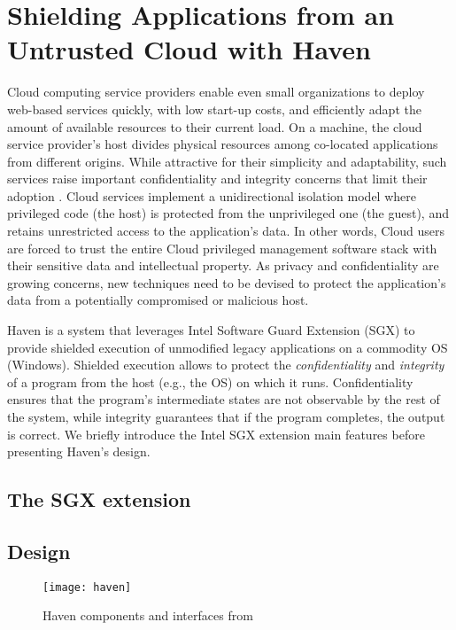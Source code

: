 \section{Shielding Applications from an Untrusted Cloud with Haven}

Cloud computing service providers enable even small organizations to deploy web-based services quickly, with low start-up costs, and efficiently adapt the amount of available resources to their current load.
On a machine, the cloud service provider's host divides physical resources among co-located applications from different origins.
While attractive for their simplicity and adaptability, such services raise important confidentiality and integrity concerns that limit their adoption \cite{mining,NSAYahoo}.
Cloud services implement a unidirectional isolation model where privileged code (the host) is protected from the unprivileged one (the guest), and retains unrestricted access to the application's data.
In other words, Cloud users are forced to trust the entire Cloud privileged management software stack with their sensitive data and intellectual property.
As privacy and confidentiality are growing concerns, new techniques need to be devised to protect the application's data from a potentially compromised or malicious host.

Haven \cite{DBLP:journals/tocs/BaumannPH15} is a system that leverages Intel Software Guard Extension (SGX) \cite{SGXManual} to provide shielded execution of unmodified legacy applications on a commodity OS (Windows).
Shielded execution allows to protect the \emph{confidentiality} and \emph{integrity} of a program from the host (e.g., the OS) on which it runs.
Confidentiality ensures that the program's intermediate states are not observable by the rest of the system, while integrity guarantees that if the program completes, the output is correct.
We briefly introduce the Intel SGX extension main features before presenting Haven's design.

\subsection{The SGX extension}



\subsection{Design}

\begin{figure*}
	\centering
	\captionsetup{justification=centering}
  	\texttt{[image: haven]}
  	\caption{Haven components and interfaces from \cite{DBLP:journals/tocs/BaumannPH15}}
  	\label{stackOfHaven}
\end{figure*}

